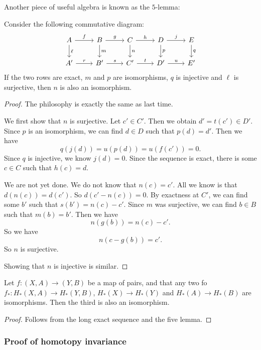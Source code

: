 \documentclass[a4paper]{article}
\begin{document}
Another piece of useful algebra is known as the $5$-lemma:
\begin{lemma}
  Consider the following commutative diagram:
  \[
    \begin{tikzcd}
      A \ar[r, "f"] \ar[d, "\ell"] & B \ar[r, "g"] \ar[d, "m"] & C \ar[r, "h"] \ar[d, "n"] & D \ar[r, "j"] \ar[d, "p"] & E \ar[d, "q"]\\
      A' \ar[r, "r"] & B' \ar[r, "s"] & C' \ar[r, "t"] & D' \ar[r, "u"] & E'
    \end{tikzcd}
  \]
  If the two rows are exact, $m$ and $p$ are isomorphisms, $q$ is injective and $\ell$ is surjective, then $n$ is also an isomorphism.
\end{lemma}

\begin{proof}
  The philosophy is exactly the same as last time.

  We first show that $n$ is surjective. Let $c' \in C'$. Then we obtain $d' = t(c') \in D'$. Since $p$ is an isomorphism, we can find $d \in D$ such that $p(d) = d'$. Then we have
  \[
    q(j(d)) = u(p(d)) = u(f(c')) = 0.
  \]
  Since $q$ is injective, we know $j(d) = 0$. Since the sequence is exact, there is some $c \in C$ such that $h(c) = d$.

  We are not yet done. We do not know that $n(c) = c'$. All we know is that $d(n(c)) = d(c')$. So $d(c' - n(c)) = 0$. By exactness at $C'$, we can find some $b'$ such that $s(b') = n(c) - c'$. Since $m$ was surjective, we can find $b \in B$ such that $m(b) = b'$. Then we have
  \[
    n(g(b)) = n(c) - c'.
  \]
  So we have
  \[
    n(c - g(b)) = c'.
  \]
  So $n$ is surjective.

  Showing that $n$ is injective is similar.
\end{proof}

\begin{cor}
  Let $f: (X, A) \to (Y, B)$ be a map of pairs, and that any two fo $f_*: H_*(X, A) \to H_*(Y, B)$, $H_*(X) \to H_*(Y)$ and $H_*(A) \to H_*(B)$ are isomorphisms. Then the third is also an isomorphism.
\end{cor}

\begin{proof}
  Follows from the long exact sequence and the five lemma.
\end{proof}

\subsubsection*{Proof of homotopy invariance}
\end{document}
